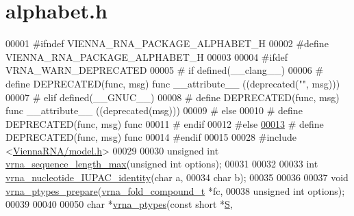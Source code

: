 \hypertarget{alphabet_8h_source}{}\section{alphabet.\+h}
\label{alphabet_8h_source}

\begin{DoxyCode}
00001 \textcolor{preprocessor}{#ifndef VIENNA\_RNA\_PACKAGE\_ALPHABET\_H}
00002 \textcolor{preprocessor}{#define VIENNA\_RNA\_PACKAGE\_ALPHABET\_H}
00003 
00004 \textcolor{preprocessor}{#ifdef VRNA\_WARN\_DEPRECATED}
00005 \textcolor{preprocessor}{# if defined(\_\_clang\_\_)}
00006 \textcolor{preprocessor}{#  define DEPRECATED(func, msg) func \_\_attribute\_\_ ((deprecated("", msg)))}
00007 \textcolor{preprocessor}{# elif defined(\_\_GNUC\_\_)}
00008 \textcolor{preprocessor}{#  define DEPRECATED(func, msg) func \_\_attribute\_\_ ((deprecated(msg)))}
00009 \textcolor{preprocessor}{# else}
00010 \textcolor{preprocessor}{#  define DEPRECATED(func, msg) func}
00011 \textcolor{preprocessor}{# endif}
00012 \textcolor{preprocessor}{#else}
\mbox{\hyperlink{alphabet_8h_aab347a3c03fbe8e7319551b9fa0cce4a}{00013}} \textcolor{preprocessor}{# define DEPRECATED(func, msg) func}
00014 \textcolor{preprocessor}{#endif}
00015 
00028 \textcolor{preprocessor}{#include <\mbox{\hyperlink{model_8h}{ViennaRNA/model.h}}>}
00029 
00030 \textcolor{keywordtype}{unsigned} \textcolor{keywordtype}{int} \mbox{\hyperlink{group__utils_ga0fe05749df8bae9d2eda9013d6ba5551}{vrna\_sequence\_length\_max}}(\textcolor{keywordtype}{unsigned} \textcolor{keywordtype}{int} options);
00031 
00032 
00033 \textcolor{keywordtype}{int} \mbox{\hyperlink{group__utils_ga2ee2b98985e6335910f128c81c8f5842}{vrna\_nucleotide\_IUPAC\_identity}}(\textcolor{keywordtype}{char} a,
00034                                    \textcolor{keywordtype}{char} b);
00035 
00036 
00037 \textcolor{keywordtype}{void} \mbox{\hyperlink{group__utils_gafa82673941b3bbb8006e9ca105fa33b9}{vrna\_ptypes\_prepare}}(\mbox{\hyperlink{group__fold__compound_structvrna__fc__s}{vrna\_fold\_compound\_t}} *fc,
00038                          \textcolor{keywordtype}{unsigned} \textcolor{keywordtype}{int}         options);
00039 
00040 
00050 \textcolor{keywordtype}{char} *\mbox{\hyperlink{group__utils_ga51a9e86a5f731f5f2f5584ee67cee4a8}{vrna\_ptypes}}(\textcolor{keyword}{const} \textcolor{keywordtype}{short} *\mbox{\hyperlink{group__energy__parameters__rw_gga7bf2bb363bcf5ce50d60255d256e5682af1ce01387d2348f8b858721a7db81670}{S}},

\end{DoxyCode}
